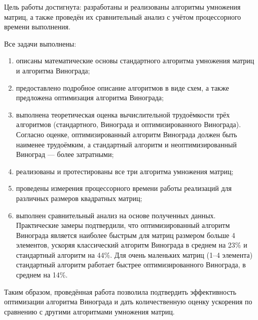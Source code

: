 
Цель работы достигнута: разработаны и реализованы алгоритмы умножения матриц, а также проведён их сравнительный анализ с учётом процессорного времени выполнения.

Все задачи выполнены:
\begin{enumerate}
	\item описаны математические основы стандартного алгоритма умножения матриц и алгоритма Винограда;
	\item предоставлено подробное описание алгоритмов в виде схем, а также предложена оптимизация алгоритма Винограда;
	\item выполнена теоретическая оценка вычислительной трудоёмкости трёх алгоритмов (стандартного, Винограда и оптимизированного Винограда). Согласно оценке, оптимизированный алгоритм Винограда должен быть наименее трудоёмким, а стандартный алгоритм и неоптимизированный Виноград --- более затратными;
	\item реализованы и протестированы все три алгоритма умножения матриц;
	\item проведены измерения процессорного времени работы реализаций для различных размеров квадратных матриц;
	\item выполнен сравнительный анализ на основе полученных данных. Практические замеры подтвердили, что оптимизированный алгоритм Винограда является наиболее быстрым для матриц размером больше 4 элементов, ускоряя классический алгоритм Винограда в среднем на 23\% и стандартный алгоритм на 44\%. Для очень маленьких матриц (1–4 элемента) стандартный алгоритм работает быстрее оптимизированного Винограда, в среднем на 14\%.
\end{enumerate}

Таким образом, проведённая работа позволила подтвердить эффективность оптимизации алгоритма Винограда и дать количественную оценку ускорения по сравнению с другими алгоритмами умножения матриц.

